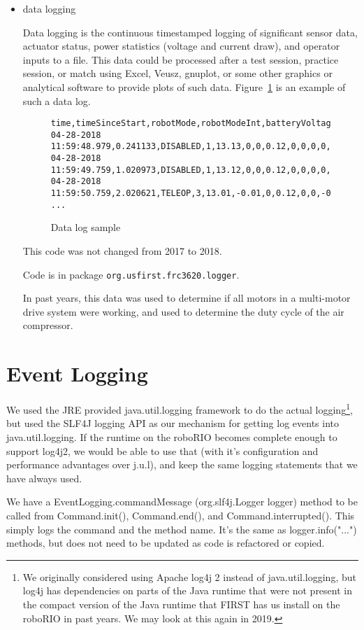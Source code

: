 \documentclass[]{article}
\begin{document}
\begin{itemize}[topsep=0pt]
\item data logging

Data logging is the continuous timestamped logging of significant sensor data, actuator status, power statistics (voltage and current draw), and operator inputs to a file.
This data could be processed after a test session, practice session, or match using Excel, Veusz, gnuplot, or some other graphics or analytical software to provide plots of such data.
Figure~\ref{fig:datalog} is an example of such a data log.

\begin{figure}[h]
\begin{mdframed}
\begin{lstlisting}[basicstyle=\ttfamily\tiny]
time,timeSinceStart,robotMode,robotModeInt,batteryVoltage,drive.l1.power,drive.l1.voltage,drive.l1.current,drive.l3.voltage,drive.l4.voltage,drive.r1.power,drive.r1.voltage,drive.r1.current,drive.r3.voltage,drive.r4.voltage
04-28-2018 11:59:48.979,0.241133,DISABLED,1,13.13,0,0,0.12,0,0,0,0,0.12,0,0
04-28-2018 11:59:49.759,1.020973,DISABLED,1,13.12,0,0,0.12,0,0,0,0,0.12,0,0
04-28-2018 11:59:50.759,2.020621,TELEOP,3,13.01,-0.01,0,0.12,0,0,-0.02,0,0.12,0,0
...
\end{lstlisting}
\caption{Data log sample}
\label{fig:datalog}
\end{mdframed}
\end{figure}

This code was not changed from 2017 to 2018.

Code is in package \texttt{org.usfirst.frc3620.logger}.

In past years, this data was used to determine if all motors in a multi-motor drive system were working, and used to determine the duty cycle of the air compressor.


\end{itemize}

\section {Event Logging}

We used the JRE provided java.util.logging framework to do the actual logging\footnote {
We originally considered using Apache log4j 2 instead of java.util.logging, but log4j has dependencies on parts of the Java runtime that were not present in the compact version of the Java runtime that FIRST has us install on the roboRIO in past years. We may look at this again in 2019.
}, but used the SLF4J logging API as our mechanism for getting log events into java.util.logging.
If the runtime on the roboRIO becomes complete enough to support log4j2, we would be able to use that (with it's configuration and performance advantages over j.u.l), and keep the same logging statements that we have always used.

We have a EventLogging.commandMessage (org.slf4j.Logger logger) method to be called from Command.init(), Command.end(), and  Command.interrupted(). This simply logs the command and the method name. It's the same as logger.info("...") methods, but does not need to be updated as code is refactored or copied.
\end{document}
